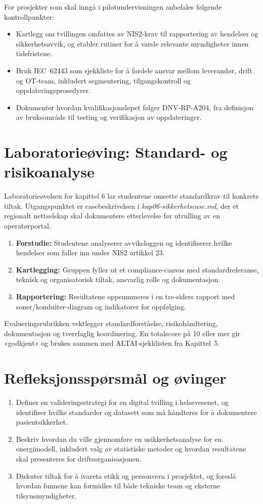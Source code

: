 For prosjekter som skal inngå i pilotundervisningen anbefales følgende kontrollpunkter:
\begin{itemize}
    \item Kartlegg om tvillingen omfattes av NIS2-krav til rapportering av hendelser og sikkerhetsavvik, og etabler rutiner for å varsle relevante myndigheter innen tidsfristene.
    \item Bruk IEC~62443 som sjekkliste for å fordele ansvar mellom leverandør, drift og OT-team, inkludert segmentering, tilgangskontroll og oppdateringsprosedyrer.
    \item Dokumenter hvordan kvalifikasjonsløpet følger DNV-RP-A204, fra definisjon av bruksområde til testing og verifikasjon av oppdateringer.
\end{itemize}
\section{Laboratorieøving: Standard- og risikoanalyse}
Laboratorieøvelsen for kapittel 6 lar studentene omsette standardkrav til konkrete tiltak. Utgangspunktet er casebeskrivelsen i \textit{kap06-sikkerhetscase.md}, der et regionalt nettselskap skal dokumentere etterlevelse før utrulling av en operatørportal.

\begin{enumerate}
    \item \textbf{Forstudie:} Studentene analyserer avviksloggen og identifiserer hvilke hendelser som faller inn under NIS2 artikkel 23.
    \item \textbf{Kartlegging:} Gruppen fyller ut et compliance-canvas med standardreferanse, teknisk og organisatorisk tiltak, ansvarlig rolle og dokumentasjon.
    \item \textbf{Rapportering:} Resultatene oppsummeres i en tre-siders rapport med soner/konduiter-diagram og indikatorer for oppfølging.
\end{enumerate}

Evalueringsrubrikken vektlegger standardforståelse, risikohåndtering, dokumentasjon og tverrfaglig koordinering. En totalscore på 10 eller mer gir «godkjent» og brukes sammen med ALTAI-sjekklisten fra Kapittel~5.

\section{Refleksjonsspørsmål og øvinger}
\begin{enumerate}
    \item Definer en valideringsstrategi for en digital tvilling i helsevesenet, og identifiser hvilke standarder og datasett som må håndteres for å dokumentere pasientsikkerhet.
    \item Beskriv hvordan du ville gjennomføre en usikkerhetsanalyse for en energimodell, inkludert valg av statistiske metoder og hvordan resultatene skal presenteres for driftsorganisasjonen.
    \item Diskuter tiltak for å ivareta etikk og personvern i prosjektet, og foreslå hvordan funnene kan formidles til både tekniske team og eksterne tilsynsmyndigheter.
\end{enumerate}
